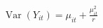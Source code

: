 \documentclass[preview]{standalone}
\begin{document}
\begin{align*}
\operatorname{Var}(Y_{it})=\mu_{it}+\frac{\mu_{it}^2}{r}
\end{align*}
\end{document}
